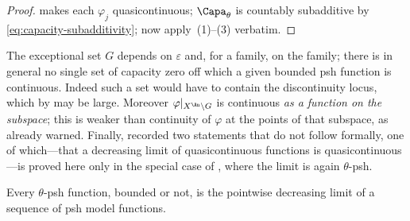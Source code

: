 \begin{proof}
 makes each \(\varphi_j\) quasicontinuous;
\(\Capa_\theta\) is countably subadditive by
\eqref{eq:capacity-subadditivity}; now apply
\,(1)--(3) verbatim.
\end{proof}

\begin{remark}
\label{rem:ch25-qc-not}
The exceptional set \(G\) depends on \(\varepsilon\) and, for a family, on
the family; there is in general no single set of capacity zero off which a
given bounded psh function is continuous.  Indeed such a set would have to
contain the discontinuity locus, which by
 may be large.  Moreover
\(\varphi|_{X^{\An}\setminus G}\) is continuous \emph{as a function on the
subspace}; this is weaker than continuity of \(\varphi\) at the points of
that subspace, as  already warned.  Finally,
 recorded two statements that do not follow
formally, one of which---that a decreasing limit of quasicontinuous
functions is quasicontinuous---is proved here only in the special case of
, where the limit is again
\(\theta\)-psh.
\end{remark}

\begin{corollary}
\label{cor:psh-sequential-regularization}
Every \(\theta\)-psh function, bounded or not, is the pointwise decreasing
limit of a sequence of psh model functions.
\end{corollary}

